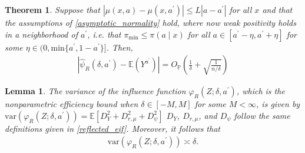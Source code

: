 \documentclass[10pt,a4paper]{amsart}
\newtheorem{theorem}{Theorem}
\newtheorem{lemma}{Lemma}
\newcommand{\E}{\mathbb{E}}
\newcommand{\var}{\text{var}}
\begin{document}
\begin{theorem} \label{dose_response_theorem}
    Suppose that $|\mu(x, a) - \mu(x, a^\prime)| \leq L|a - a^\prime|$ for all $x$ and that the assumptions of \cref{asymptotic_normality} hold, where now weak positivity holds in a neighborhood of $a^\prime$, i.e. that $\pi_{\min} \leq \pi(a \mid x)$ for all $a \in  [a^{\prime} - \eta, a^\prime + \eta]$ for some $\eta \in (0, \text{min}\{a^\prime, 1 - a^\prime\}]$. Then,
    \begin{align*}
        \left|\widehat{\psi}_R(\delta, a^\prime) - \E(Y^{a^\prime}) \right| = O_\mathbb{P}\left(\frac{1}{\delta} + \sqrt{\frac{1}{n/\delta}} \right)
    \end{align*}
\end{theorem}

\begin{lemma} \label{reflected_efficiency_bound}
    The variance of the influence function $\varphi_R(Z;\delta, a^\prime )$, which is the nonparametric efficiency bound when $\delta \in [-M,M]$ for some $M<\infty$, is given by $\var(\varphi_R(Z;\delta, a^\prime)) = \mathbb{E}[D^2_Y + D^2_{r, \mu} + D^2_\psi]$ $D_Y$, $D_{r, \mu}$, and $D_\psi$ follow the same definitions given in \cref{reflected_eif}. Moreover, it follows that
    \begin{align*}
        \var(\varphi_R(Z;\delta, a^\prime)) \asymp \delta.
    \end{align*}
\end{lemma}
\end{document}
